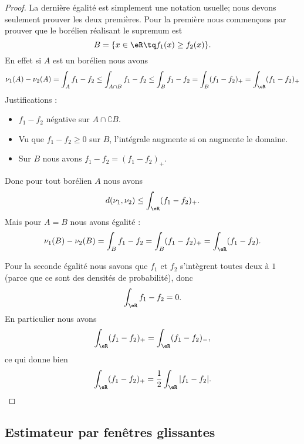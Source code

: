 \begin{proof}
	La dernière égalité est simplement une notation usuelle; nous devons seulement prouver les deux premières. Pour la première nous commençons par prouver que le borélien réalisant le supremum est
	\begin{equation}
		B=\{ x\in\eR\tq f_1(x)\geq f_2(x) \}.
	\end{equation}
	En effet si \( A\) est un borélien nous avons
	\begin{equation}
		\nu_1(A)-\nu_2(A)=\int_Af_1-f_2
		\leq\int_{A\cap B}f_1-f_2
		\leq\int_Bf_1-f_2
		=\int_B(f_1-f_2)_+
		=\int_{\eR}(f_1-f_2)_+
	\end{equation}
	Justifications :
	\begin{itemize}
		\item  \( f_1-f_2\) négative sur \( A\cap \complement B\).
		\item Vu que \( f_1-f_2\geq0\) sur \( B\), l'intégrale augmente si on augmente le domaine.
		\item Sur \( B\) nous avons \( f_1-f_2=(f_1-f_2)_+\).
	\end{itemize}
	Donc pour tout borélien \( A\) nous avons
	\begin{equation}
		d(\nu_1,\nu_2)\leq \int_{\eR}(f_1-f_2)_+.
	\end{equation}
	Mais pour \( A=B\) nous avons égalité :
	\begin{equation}
		\nu_1(B)-\nu_2(B)=\int_{B}f_1-f_2=\int_B(f_1-f_2)_+=\int_{\eR}(f_1-f_2).
	\end{equation}

	Pour la seconde égalité nous savons que \( f_1\) et \( f_2\) s'intègrent toutes deux à \( 1\) (parce que ce sont des densités de probabilité), donc
	\begin{equation}
		\int_{\eR}f_1-f_2=0.
	\end{equation}
	En particulier nous avons
	\begin{equation}
		\int_{\eR}(f_1-f_2)_+=\int_{\eR}(f_1-f_2)_-,
	\end{equation}
	ce qui donne bien
	\begin{equation}
		\int_{\eR}(f_1-f_2)_+=\frac{ 1 }{2}\int_{\eR}|f_1-f_2|.
	\end{equation}
\end{proof}

\subsection{Estimateur par fenêtres glissantes}

